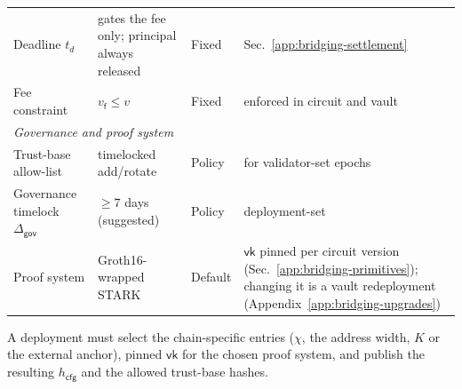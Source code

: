 \begin{longtable}{p{3.0cm}p{4.2cm}p{2.0cm}p{3.4cm}}
Deadline $t_d$ & gates the fee only; principal always released & Fixed & Sec.~\ref{app:bridging-settlement} \\
Fee constraint & $v_\mathsf{f} \le v$ & Fixed & enforced in circuit and vault \\
\hline
\multicolumn{4}{l}{\textit{Governance and proof system}}\\
\hline
Trust-base allow-list & timelocked add/rotate & Policy & for validator-set epochs \\
Governance timelock $\Delta_\mathsf{gov}$ & $\ge 7$ days (suggested) & Policy & deployment-set \\
Proof system & Groth16-wrapped STARK & Default & $\mathsf{vk}$ pinned per circuit version (Sec.~\ref{app:bridging-primitives}); changing it is a vault redeployment (Appendix~\ref{app:bridging-upgrades}) \\
\end{longtable}

A deployment must select the chain-specific entries ($\chi$, the address width, $K$ or the external anchor), pinned $\mathsf{vk}$ for the chosen proof system, and publish the resulting $h_\mathsf{cfg}$ and the allowed trust-base hashes.

